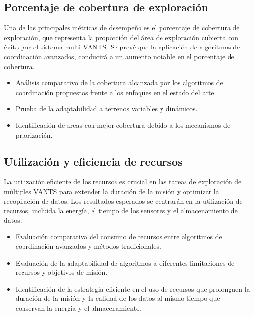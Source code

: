 \documentclass[sigconf]{acmart}
\begin{document}
\subsection*{Porcentaje de cobertura de exploración}

Una de las principales métricas de desempeño es el porcentaje de cobertura de exploración, que representa la proporción del área de exploración cubierta con éxito por el sistema multi-VANTS. Se prevé que la aplicación de algoritmos de coordinación avanzados, conducirá a un aumento notable en el porcentaje de cobertura.

\begin{itemize}
\item Análisis comparativo de la cobertura alcanzada por los algoritmos de coordinación propuestos frente a los enfoques en el estado del arte.
\item Prueba de la adaptabilidad a terrenos variables y dinámicos.
\item Identificación de áreas con mejor cobertura debido a los mecanismos de priorización.
\end{itemize}
  
\subsection*{Utilización y eficiencia de recursos}

La utilización eficiente de los recursos es crucial en las tareas de exploración de múltiples VANTS para extender la duración de la misión y optimizar la recopilación de datos. Los resultados esperados se centrarán en la utilización de recursos, incluida la energía, el tiempo de los sensores y el almacenamiento de datos.

\begin{itemize}
\item Evaluación comparativa del consumo de recursos entre algoritmos de coordinación avanzados y métodos tradicionales.
  
\item Evaluación de la adaptabilidad de algoritmos a diferentes limitaciones de recursos y objetivos de misión.
  
\item Identificación de la estrategia eficiente en el uso de recursos que prolonguen la duración de la misión y la calidad de los datos al mismo tiempo que conservan la energía y el almacenamiento.
  
\end{itemize}
\end{document}
